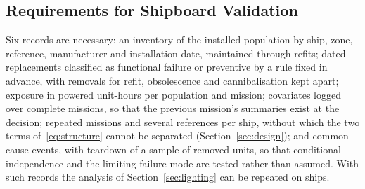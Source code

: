 \subsection{Requirements for Shipboard Validation}
\label{sec:needed}
Six records are necessary: an inventory of the installed population by ship,
zone, reference, manufacturer and installation date, maintained through refits;
dated replacements classified as functional failure or preventive by a rule
fixed in advance, with removals for refit, obsolescence and cannibalisation kept
apart; exposure in powered unit-hours per population and mission; covariates
logged over complete missions, so that the previous mission's summaries exist
at the decision; repeated missions and several references per ship, without
which the two terms of~\eqref{eq:structure} cannot be separated
(Section~\ref{sec:design}); and common-cause events, with teardown of a sample
of removed units, so that conditional independence and the limiting failure mode
are tested rather than assumed. With such records the analysis of
Section~\ref{sec:lighting} can be repeated on ships.

